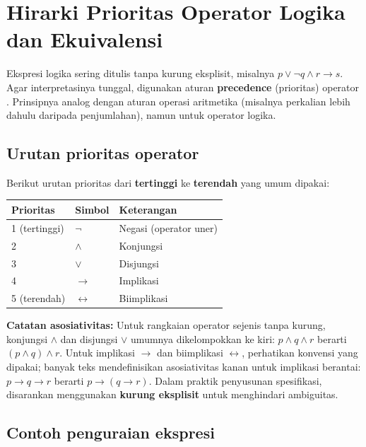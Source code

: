 \section{Hirarki Prioritas Operator Logika dan Ekuivalensi}

Ekspresi logika sering ditulis tanpa kurung eksplisit, misalnya $p \lor \neg q \land r \rightarrow s$. Agar interpretasinya tunggal, digunakan aturan \textbf{precedence} (prioritas) operator \cite{rosen2019}. Prinsipnya analog dengan aturan operasi aritmetika (misalnya perkalian lebih dahulu daripada penjumlahan), namun untuk operator logika.

\subsection{Urutan prioritas operator}

Berikut urutan prioritas dari \textbf{tertinggi} ke \textbf{terendah} yang umum dipakai:

\begin{center}
	\small
	\begin{tabular}{|p{2.2cm}|p{1.4cm}|p{7.6cm}|}
		\hline
		\textbf{Prioritas} & \textbf{Simbol} & \textbf{Keterangan} \\
		\hline
		1 (tertinggi) & $\neg$ & Negasi (operator uner) \\ \hline
		2 & $\wedge$ & Konjungsi \\ \hline
		3 & $\vee$ & Disjungsi \\ \hline
		4 & $\rightarrow$ & Implikasi \\ \hline
		5 (terendah) & $\leftrightarrow$ & Biimplikasi \\ \hline
	\end{tabular}
\end{center}

\textbf{Catatan asosiativitas:} Untuk rangkaian operator sejenis tanpa kurung, konjungsi $\wedge$ dan disjungsi $\vee$ umumnya dikelompokkan ke kiri: $p \wedge q \wedge r$ berarti $(p \wedge q) \wedge r$. Untuk implikasi $\rightarrow$ dan biimplikasi $\leftrightarrow$, perhatikan konvensi yang dipakai; banyak teks mendefinisikan asosiativitas kanan untuk implikasi berantai: $p \rightarrow q \rightarrow r$ berarti $p \rightarrow (q \rightarrow r)$. Dalam praktik penyusunan spesifikasi, disarankan menggunakan \textbf{kurung eksplisit} untuk menghindari ambiguitas.

\subsection{Contoh penguraian ekspresi}

